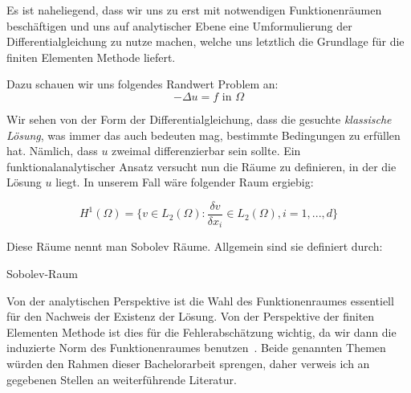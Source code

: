 Es ist naheliegend, dass wir uns zu erst mit notwendigen Funktionenräumen beschäftigen und uns auf analytischer Ebene eine Umformulierung der Differentialgleichung zu nutze machen, welche uns letztlich die Grundlage für die finiten Elementen Methode liefert.

Dazu schauen wir uns folgendes Randwert Problem an:
\begin{equation}
	- \Delta u = f \text{ in } \Omega	
\end{equation}

Wir sehen von der Form der Differentialgleichung, dass die gesuchte \textit{klassische Lösung}, was immer das auch bedeuten mag, bestimmte Bedingungen zu erfüllen hat. Nämlich, dass $u$ zweimal differenzierbar sein sollte.
Ein funktionalanalytischer Ansatz versucht nun die Räume zu definieren, in der die Lösung $u$ liegt. In unserem Fall wäre folgender Raum ergiebig:

\begin{equation*}
	H^{1}(\Omega) = \{ v \in L_{2}(\Omega) : \dfrac{\delta v}{\delta x_{i}} \in L_{2}(\Omega), i=1,...,d \}
\end{equation*}

Diese Räume nennt man Sobolev Räume. Allgemein sind sie definiert durch:

\begin{Definition} Sobolev-Raum

\end{Definition}

Von der analytischen Perspektive ist die Wahl des Funktionenraumes essentiell für den Nachweis der Existenz der Lösung. Von der Perspektive der finiten Elementen Methode ist dies für die Fehlerabschätzung wichtig, da wir dann die induzierte Norm des Funktionenraumes benutzen~\cite[36]{Johnson}. Beide genannten Themen würden den Rahmen dieser Bachelorarbeit sprengen, daher verweis ich an gegebenen Stellen an weiterführende Literatur.

